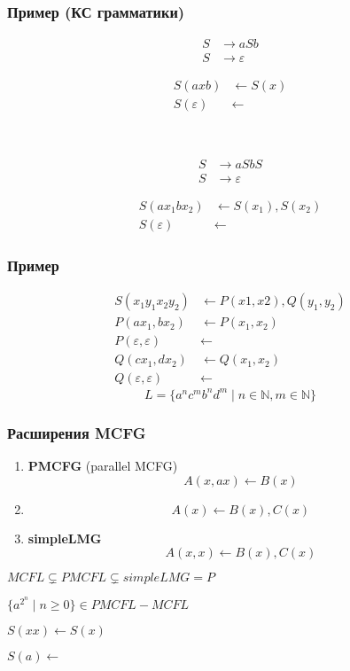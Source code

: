 \documentclass{beamer}
\begin{document}
\begin{frame}[fragile]
  \frametitle{Пример (КС грамматики)}
\begin{minipage}[t]{0.48\textwidth}
\begin{align*}
S &\to a S b \\
S &\to \varepsilon
\end{align*} 

\begin{align*}
S(axb) & \leftarrow S(x) \\
S(\varepsilon) & \leftarrow 
\end{align*} 
\end{minipage}
~\pause
\begin{minipage}[t]{0.48\textwidth}
\begin{align*}
S &\to a S b S\\
S &\to \varepsilon
\end{align*} 

\begin{align*}
S(ax_1bx_2) & \leftarrow S(x_1), S(x_2) \\
S(\varepsilon) & \leftarrow 
\end{align*} 
\end{minipage}

\end{frame}


\begin{frame}[fragile]
  
  \frametitle{Пример}

\begin{align*}
S(x_1 y_1 x_2 y_2) & \leftarrow P(x1,x2),Q(y_1,y_2) \\
P(ax_1, bx_2) & \leftarrow P(x_1,x_2) \\
P(\varepsilon,\varepsilon) &\leftarrow  \\
Q(cx_1, dx_2) & \leftarrow Q(x_1,x_2) \\
Q(\varepsilon,\varepsilon) &\leftarrow  
\end{align*} 
\pause
$$
L = \{a^nc^mb^nd^m \mid n \in \mathbb{N}, m \in \mathbb{N} \}
$$
\end{frame}

\begin{frame}[fragile]
  
  \frametitle{Расширения MCFG}
  \begin{enumerate}
    \item \textbf{PMCFG} (parallel MCFG) 
    $$
    A(x, ax) \leftarrow B(x)
    $$

    \item 
    $$
    A(x) \leftarrow B(x),C(x)
    $$
    \item \textbf{simpleLMG} 
    $$
    A(x, x) \leftarrow B(x),C(x)
    $$
  \end{enumerate}
  \pause
  $MCFL \varsubsetneq PMCFL \varsubsetneq simpleLMG = P$

  $\{a^{2^n} \mid n\geq 0\} \in PMCFL - MCFL $

  $S(xx) \leftarrow S(x)$  

  $S(a) \leftarrow $
\end{frame}
\end{document}
